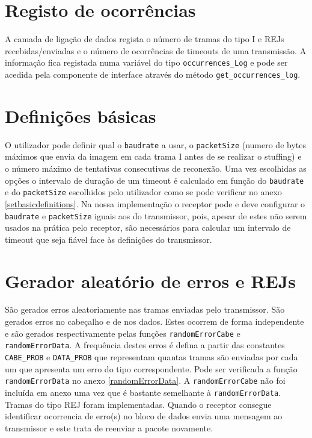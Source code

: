 \documentclass[11pt,a4paper,reqno]{report}
\numberwithin{equation}{section}
\begin{document}
\section{Registo de ocorrências}

A camada de ligação de dados regista o número de tramas do tipo I e REJs recebidas/enviadas e o número de ocorrências de timeouts de uma transmissão. A informação fica registada numa variável do tipo \verb|occurrences_Log| e pode ser acedida pela componente de interface através do método \verb|get_occurrences_log|.

\section{Definições básicas}

O utilizador pode definir qual o \verb|baudrate| a usar, o \verb|packetSize| (numero de bytes máximos que envia da imagem em cada trama I antes de se realizar o stuffing) e o número máximo de tentativas consecutivas de reconexão.
Uma vez escolhidas as opções o intervalo de duração de um timeout é calculado em função do \verb|baudrate| e do \verb|packetSize| escolhidos pelo utilizador como se pode verificar no anexo \ref{setbasicdefinitions}. Na nossa implementação o receptor pode e deve configurar o \verb|baudrate| e \verb|packetSize| iguais aos do transmissor, pois, apesar de estes não serem usados na prática pelo receptor, são necessários para calcular um intervalo de timeout que seja fiável face às definições do transmissor.

\section{Gerador aleatório de erros e REJs}
São gerados erros aleatoriamente nas tramas enviadas pelo transmissor. São gerados erros no cabeçalho e de nos dados. Estes ocorrem de forma independente e são gerados respectivamente pelas funções \verb|randomErrorCabe| e \verb|randomErrorData|. A frequência destes erros é defina a partir das constantes \verb|CABE_PROB| e \verb|DATA_PROB| que representam quantas tramas são enviadas por cada um que apresenta um erro do tipo correspondente. Pode ser verificada a função \verb|randomErrorData| no anexo \ref{randomErrorData}. A \verb|randomErrorCabe| não foi incluída em anexo uma vez que é bastante semelhante à \verb|randomErrorData|.
Tramas do tipo REJ foram implementadas. Quando o receptor consegue identificar ocorrencia de erro(s) no bloco de dados envia uma mensagem ao transmissor e este trata de reenviar a pacote novamente.
\end{document}

